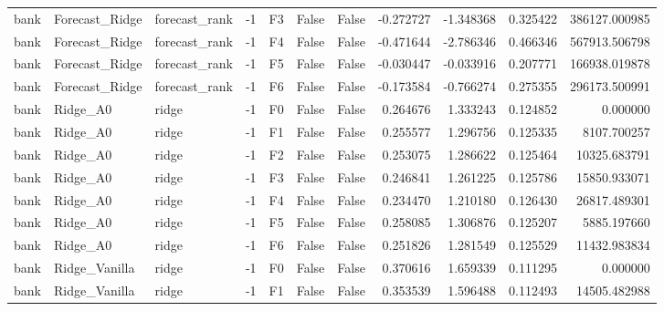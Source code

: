 \begin{tabular}{lllrlllrrrr}
      bank &               Forecast\_Ridge & forecast\_rank &    -1 &  F3 &           False &            False & -0.272727 & -1.348368 & 0.325422 &    386127.000985 \\
      bank &               Forecast\_Ridge & forecast\_rank &    -1 &  F4 &           False &            False & -0.471644 & -2.786346 & 0.466346 &    567913.506798 \\
      bank &               Forecast\_Ridge & forecast\_rank &    -1 &  F5 &           False &            False & -0.030447 & -0.033916 & 0.207771 &    166938.019878 \\
      bank &               Forecast\_Ridge & forecast\_rank &    -1 &  F6 &           False &            False & -0.173584 & -0.766274 & 0.275355 &    296173.500991 \\
      bank &                     Ridge\_A0 &         ridge &    -1 &  F0 &           False &            False &  0.264676 &  1.333243 & 0.124852 &         0.000000 \\
      bank &                     Ridge\_A0 &         ridge &    -1 &  F1 &           False &            False &  0.255577 &  1.296756 & 0.125335 &      8107.700257 \\
      bank &                     Ridge\_A0 &         ridge &    -1 &  F2 &           False &            False &  0.253075 &  1.286622 & 0.125464 &     10325.683791 \\
      bank &                     Ridge\_A0 &         ridge &    -1 &  F3 &           False &            False &  0.246841 &  1.261225 & 0.125786 &     15850.933071 \\
      bank &                     Ridge\_A0 &         ridge &    -1 &  F4 &           False &            False &  0.234470 &  1.210180 & 0.126430 &     26817.489301 \\
      bank &                     Ridge\_A0 &         ridge &    -1 &  F5 &           False &            False &  0.258085 &  1.306876 & 0.125207 &      5885.197660 \\
      bank &                     Ridge\_A0 &         ridge &    -1 &  F6 &           False &            False &  0.251826 &  1.281549 & 0.125529 &     11432.983834 \\
      bank &                Ridge\_Vanilla &         ridge &    -1 &  F0 &           False &            False &  0.370616 &  1.659339 & 0.111295 &         0.000000 \\
      bank &                Ridge\_Vanilla &         ridge &    -1 &  F1 &           False &            False &  0.353539 &  1.596488 & 0.112493 &     14505.482988 \\

\end{tabular}
